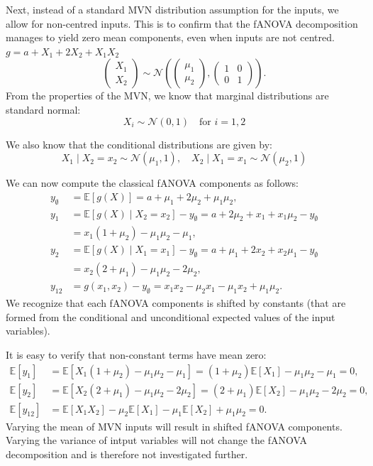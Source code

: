 Next, instead of a standard MVN distribution assumption for the inputs, we allow for non-centred inputs. This is to confirm that the fANOVA decomposition manages to yield zero mean components, even when inputs are not centred.
\(g = a + X_1 + 2X_2 + X_1 X_2\)
\[
\begin{pmatrix}
X_1 \\
X_2
\end{pmatrix}
\sim \mathcal{N}\left(
\begin{pmatrix} \mu_1 \\ \mu_2 \end{pmatrix},
\begin{pmatrix}
1 & 0 \\
0 & 1
\end{pmatrix}
\right).
\]
From the properties of the MVN, we know that marginal distributions are standard normal:
\[
X_i \sim \mathcal{N}(0, 1) \quad \text{for } i = 1, 2
\]

We also know that the conditional distributions are given by:
\[
X_1 \mid X_2 = x_2 \sim \mathcal{N}(\mu_1, 1), \quad
X_2 \mid X_1 = x_1 \sim \mathcal{N}(\mu_2, 1)
\]

We can now compute the classical fANOVA components as follows:
\begin{align*}
    y_{\emptyset} &= \mathbb{E}[g(X)] = a + \mu_1 + 2\mu_2 + \mu_1 \mu_2, \\
    y_1 &= \mathbb{E}[g(X) \mid X_2 = x_2] - y_{\emptyset}= a + 2\mu_2 + x_1 + x_1 \mu_2 - y_{\emptyset} \\
    &= x_1 ( 1 + \mu_2) - \mu_1 \mu_2 - \mu_1, \\
    y_2 &= \mathbb{E}[g(X) \mid X_1 = x_1] - y_{\emptyset} = a + \mu_1 + 2x_2 + x_2 \mu_1 - y_{\emptyset} \\
    &= x_2 (2 + \mu_1) - \mu_1 \mu_2 - 2 \mu_2, \\
    y_{12} &= g(x_1, x_2) - y_{\emptyset} = x_1x_2 - \mu_2 x_1 - \mu_1 x_2 + \mu_1 \mu_2.      
\end{align*}
We recognize that each fANOVA components is shifted by constants (that are formed from the conditional and unconditional expected values of the input variables). 

It is easy to verify that non-constant terms have mean zero:
\begin{align*}
    \mathbb{E}[y_1] &= \mathbb{E}[X_1 (1 + \mu_2) - \mu_1 \mu_2 - \mu_1] = (1 + \mu_2) \mathbb{E}[X_1] - \mu_1 \mu_2 - \mu_1 = 0, \\
    \mathbb{E}[y_2] &= \mathbb{E}[X_2 (2 + \mu_1) - \mu_1 \mu_2 - 2\mu_2] = (2 + \mu_1) \mathbb{E}[X_2] - \mu_1 \mu_2 - 2\mu_2 = 0, \\
    \mathbb{E}[y_{12}] &= \mathbb{E}[X_1X_2] - \mu_2 \mathbb{E}[X_1] - \mu_1 \mathbb{E}[X_2] + \mu_1 \mu_2 = 0.
\end{align*}
Varying the mean of MVN inputs will result in shifted fANOVA components. Varying the variance of intput variables will not change the fANOVA decomposition and is therefore not investigated further.


